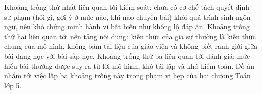 Khoảng trống thứ nhất liên quan tới kiểm soát: chưa có cơ chế tách quyết định sư phạm (hỏi gì, gợi ý ở mức nào, khi nào chuyển bài) khỏi quá trình sinh ngôn ngữ, nên khó chứng minh hành vi bất biến như không lộ đáp án. Khoảng trống thứ hai liên quan tới nền tảng nội dung: kiến thức của gia sư thường là kiến thức chung của mô hình, không bám tài liệu của giáo viên và không biết ranh giới giữa bài đang học với bài sắp học. Khoảng trống thứ ba liên quan tới đánh giá: mức hiểu bài thường được suy ra từ lời mô hình, khó tái lập và khó kiểm toán. Đồ án nhắm tới việc lấp ba khoảng trống này trong phạm vi hẹp của hai chương Toán lớp 5.
